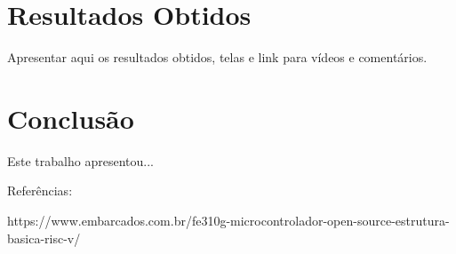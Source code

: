 \documentclass[a4paper]{sbgames}
\begin{document}
\section{Resultados Obtidos}
\label{sec:Resultados}
Apresentar aqui os resultados obtidos, telas e link para vídeos e comentários.

 

\section{Conclusão}
\label{sec:Conclusao}
Este trabalho apresentou...



Referências: 

https://www.embarcados.com.br/fe310g-microcontrolador-open-source-estrutura-basica-risc-v/




%


\end{document}
